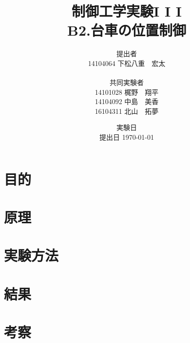 \documentclass[11pt,a4paper]{jsarticle}
\begin{document}
\title{制御工学実験I \hspace{-0.1mm} I \hspace{-0.1mm} I \\ B2.台車の位置制御}
\author{提出者 \\ 14104064 下松八重　宏太 \\ \\ 共同実験者 \\ 14101028 梶野　翔平 \\ 14104092 中島　美香 \\ 16104311 北山　拓夢}
\date{実験日 \\ 提出日 \today}


\maketitle
\thispagestyle{empty}
\newpage


\section{目的}
\section{原理}
\section{実験方法}
\section{結果}
\section{考察}
\end{document}
